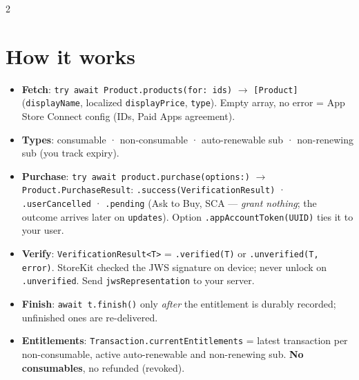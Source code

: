 \documentclass[8pt]{extarticle}
\begin{document}


\begin{multicols}{2}
\raggedright

\section{How it works}
\begin{itemize}
  \item \textbf{Fetch}: \texttt{try await Product.products(for: ids)} $\to$
        \texttt{[Product]} (\texttt{displayName}, localized
        \texttt{displayPrice}, \texttt{type}). Empty array, no error =
        App Store Connect config (IDs, Paid Apps agreement).
  \item \textbf{Types}: consumable · non-consumable · auto-renewable sub ·
        non-renewing sub (you track expiry).
  \item \textbf{Purchase}: \texttt{try await product.purchase(options:)} $\to$
        \texttt{Product.PurchaseResult}: \texttt{.success(VerificationResult)} ·
        \texttt{.userCancelled} · \texttt{.pending} (Ask to Buy, SCA —
        \emph{grant nothing}; the outcome arrives later on \texttt{updates}).
        Option \texttt{.appAccountToken(UUID)} ties it to your user.
  \item \textbf{Verify}: \texttt{VerificationResult<T>} = \texttt{.verified(T)}
        or \texttt{.unverified(T, error)}. StoreKit checked the JWS signature
        on device; never unlock on \texttt{.unverified}. Send
        \texttt{jwsRepresentation} to your server.
  \item \textbf{Finish}: \texttt{await t.finish()} only \emph{after} the
        entitlement is durably recorded; unfinished ones are re-delivered.
  \item \textbf{Entitlements}: \texttt{Transaction.currentEntitlements} =
        latest transaction per non-consumable, active auto-renewable and
        non-renewing sub. \textbf{No consumables}, no refunded (revoked).

\end{itemize}
\end{multicols}
\end{document}
